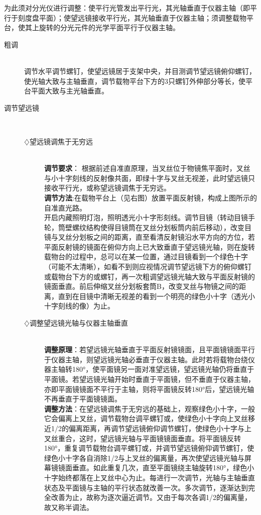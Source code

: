 为此须对分光仪进行调整：使平行光管发出平行光，其光轴垂直于仪器主轴（即平行于刻度盘平面）；使望远镜接收平行光，其光轴垂直于仪器主轴；须调整载物平台，使其上旋转的分光元件的光学平面平行于仪器主轴。

\begin{description}
\item[粗调]\hspace*{\fill}\\ 调节水平调节螺钉，使望远镜居于支架中央，并目测调节望远镜俯仰螺钉，使光轴大致与主轴垂直，调节载物平台下方的3只螺钉外伸部分等长，使平台平面大致与主光轴垂直。
\item[调节望远镜]\hspace*{\fill}\\
	\begin{description}
	\item[$\diamondsuit$望远镜调焦于无穷远]\hspace*{\fill}\\
	\textbf{调节要求}： 根据前述自准直原理，当叉丝位于物镜焦平面时，叉丝与小十字刻线的反射像共面，即绿十字与叉丝无视差，此时望远镜只接收平行光，或称望远镜调焦于无穷远。\\ \textbf{调节方法}:在载物平台上（见右图）放置平面反射镜，构成上图所示的自准直光路。\\开启内藏照明灯泡，照明透光小十字形刻线。调节目镜（转动目镜手轮，筒壁螺纹结构使得目镜筒在叉丝分划板筒内前后移动），改变目镜与叉丝分划板之间的距离，直至看清反射镜沿水平方向的方位，若平面反射镜的镜面在俯仰方向上已大致垂直于望远镜光轴，则在旋转载物台的过程中，总可以在某一位置，通过目镜看到一个绿色十字（可能不太清晰），如看不到则应视情况调节望远镜下方的俯仰螺钉或载物台下方的或螺钉，再一次粗调望远镜光轴大致与平面反射镜的镜面垂直。前后伸缩叉丝分划板套筒B，改变叉丝与物镜之间的距离，直到在目镜中清晰无视差的看到一个明亮的绿色小十字（透光小十字刻线的像）为止。
	\item[$\diamondsuit$调整望远镜光轴与仪器主轴垂直]\hspace*{\fill}\\ 
	\textbf{调整原理}：若望远镜光轴垂直于平面反射镜镜面，且平面镜镜面平行于仪器主轴，则望远镜光轴必垂直于仪器主轴。此时若将载物台绕仪器主轴转180°，使平面镜另一面对准望远镜，望远镜光轴仍将垂直于平面镜。若望远镜光轴开始时垂直于平面镜，但不垂直于仪器主轴，亦即平面镜镜面不平行于主轴，则将平面镜反转180°后，望远镜光轴不再垂直于平面镜镜面。\\
	\textbf{调整方法}：在望远镜调焦于无穷远的基础上，观察绿色小十字，一般它会偏离上叉丝，调节载物台调平螺钉或，使绿色小十字向上叉丝移近1/2的偏离距离，再调节望远镜俯仰调节螺钉，使绿色小十字与上叉丝重合，这时，望远镜光轴与平面镜镜面垂直。将平面镜反转180°，重复调节载物台调平螺钉或，并调节望远镜俯仰调节螺钉，使绿色小十字各自消除1/2与上叉丝的偏离量，再次使望远镜光轴与屏幕镜镜面垂直。如此重复几次，直至平面镜绕主轴旋转180°，绿色小十字始终都落在上叉丝中心为止。每进行一次调节，光轴与主轴垂直状态及平面镜与主轴的平行状态就改善一次。多次调节，逐渐达到完全改善为止，故称为逐次逼近调节。又由于每次各调1/2的偏离量，故又称半调法。

\end{description}
\end{description}
